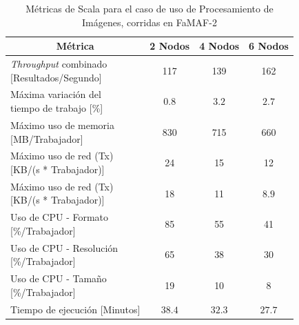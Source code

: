 \documentclass[11pt]{article}
\providecommand{\row}[1]{\parbox{150pt}{\setlength{\baselineskip}{0.2\baselineskip}\strut#1\strut}}
\newcommand{\ipcap}[2]{\caption{Métricas de #1 para el caso de uso de Procesamiento de Imágenes, corridas en #2}}
\newcommand{\english}[1]{\textit{#1}}
\begin{document}
\begin{table}[H]
\centering
\begin{tabular}{|l|c|c|c|}
\hline
\multicolumn{1}{|c|}{Métrica} & 2 Nodos & 4 Nodos & 6 Nodos \\ \hline
\row{\english{Throughput} combinado\\{[Resultados/Segundo]}} & 117 & 139 & 162 \\ \hline
\row{Máxima variación del \\ tiempo de trabajo {[}\%{]}} & $0.8$ & $3.2$ & $2.7$ \\ \hline
\row{Máximo uso de memoria \\ {[MB/Trabajador]}} & 830 & 715 & 660 \\ \hline
\row{Máximo uso de red (Tx) \\ {[KB/(s * Trabajador)]}} & 24 & 15 & 12 \\ \hline
\row{Máximo uso de red (Tx) \\ {[KB/(s * Trabajador)]}} & 18 & 11 & $8.9$ \\ \hline
\row{Uso de CPU - Formato\\{[\%/Trabajador]}} & 85 & 55 & 41 \\ \hline
\row{Uso de CPU - Resolución\\{[\%/Trabajador]}} & 65 & 38 & 30 \\ \hline
\row{Uso de CPU - Tamaño\\{[\%/Trabajador]}} & 19 & 10 & 8 \\ \hline
Tiempo de ejecución [Minutos] & $38.4$ & $32.3$ & $27.7$ \\ \hline
\end{tabular}
\ipcap{Scala}{FaMAF-2}
\end{table}
\end{document}
